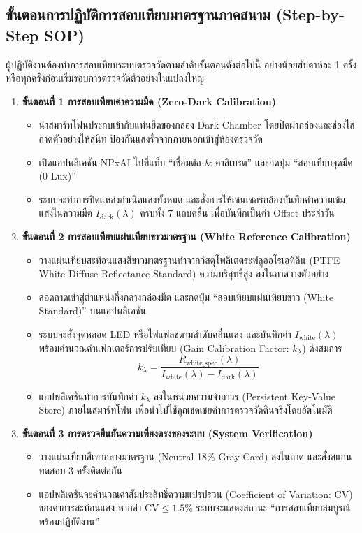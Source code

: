 \documentclass[12pt,a4paper,oneside]{book}
\begin{document}
\subsection{ขั้นตอนการปฏิบัติการสอบเทียบมาตรฐานภาคสนาม (Step-by-Step SOP)}
ผู้ปฏิบัติงานต้องทำการสอบเทียบระบบตรวจวัดตามลำดับขั้นตอนดังต่อไปนี้ อย่างน้อยสัปดาห์ละ 1 ครั้ง หรือทุกครั้งก่อนเริ่มรอบการตรวจวัดตัวอย่างในแปลงใหญ่
\begin{enumerate}
    \item \textbf{ขั้นตอนที่ 1 การสอบเทียบค่าความมืด (Zero-Dark Calibration)}
    \begin{itemize}
        \item นำสมาร์ทโฟนประกบเข้ากับแท่นยึดของกล่อง Dark Chamber โดยปิดฝากล่องและช่องใส่ถาดตัวอย่างให้สนิท ป้องกันแสงรั่วจากภายนอกเข้าสู่ห้องตรวจวัด
        \item เปิดแอปพลิเคชัน NPxAI ไปที่แท็บ ``เชื่อมต่อ \& คาลิเบรต'' และกดปุ่ม ``สอบเทียบจุดมืด (0-Lux)''
        \item ระบบจะทำการปิดแหล่งกำเนิดแสงทั้งหมด และสั่งการให้เซนเซอร์กล้องบันทึกค่าความเข้มแสงในความมืด $I_{\text{dark}}(\lambda)$ ครบทั้ง 7 แถบคลื่น เพื่อบันทึกเป็นค่า Offset ประจำวัน
    \end{itemize}
    \item \textbf{ขั้นตอนที่ 2 การสอบเทียบแผ่นเทียบขาวมาตรฐาน (White Reference Calibration)}
    \begin{itemize}
        \item วางแผ่นเทียบสะท้อนแสงสีขาวมาตรฐานทำจากวัสดุโพลีเตตระฟลูออโรเอทิลีน (PTFE White Diffuse Reflectance Standard) ความบริสุทธิ์สูง ลงในถาดวางตัวอย่าง
        \item สอดถาดเข้าสู่ตำแหน่งกึ่งกลางกล่องมืด และกดปุ่ม ``สอบเทียบแผ่นเทียบขาว (White Standard)'' บนแอปพลิเคชัน
        \item ระบบจะสั่งจุดหลอด LED หรือไฟแฟลชตามลำดับคลื่นแสง และบันทึกค่า $I_{\text{white}}(\lambda)$ พร้อมคำนวณค่าแฟกเตอร์การปรับเทียบ (Gain Calibration Factor: $k_\lambda$) ดังสมการ
        \begin{equation}
        k_\lambda = \frac{R_{\text{white\_spec}}(\lambda)}{I_{\text{white}}(\lambda) - I_{\text{dark}}(\lambda)}
        \end{equation}
        \item แอปพลิเคชันทำการบันทึกค่า $k_\lambda$ ลงในหน่วยความจำถาวร (Persistent Key-Value Store) ภายในสมาร์ทโฟน เพื่อนำไปใช้คูณชดเชยค่าการตรวจวัดดินจริงโดยอัตโนมัติ
    \end{itemize}
    \item \textbf{ขั้นตอนที่ 3 การตรวจยืนยันความเที่ยงตรงของระบบ (System Verification)}
    \begin{itemize}
        \item วางแผ่นเทียบสีเทากลางมาตรฐาน (Neutral 18\% Gray Card) ลงในถาด และสั่งสแกนทดสอบ 3 ครั้งติดต่อกัน
        \item แอปพลิเคชันจะคำนวณค่าสัมประสิทธิ์ความแปรปรวน (Coefficient of Variation: CV) ของค่าการสะท้อนแสง หากค่า $\text{CV} \le 1.5\%$ ระบบจะแสดงสถานะ ``การสอบเทียบสมบูรณ์ พร้อมปฏิบัติงาน''
    \end{itemize}
\end{enumerate}
\end{document}
